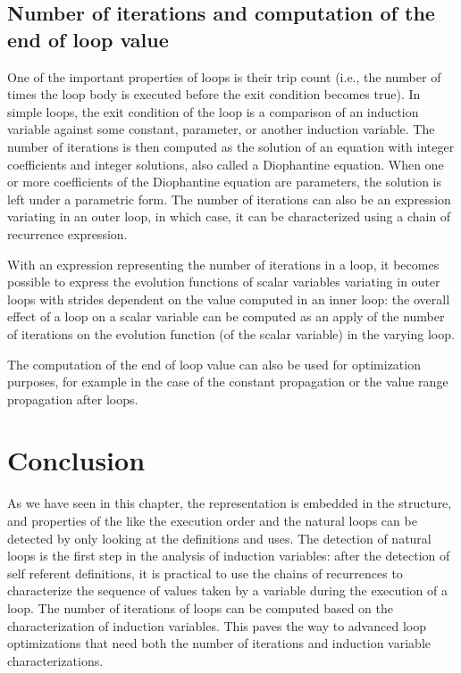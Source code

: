 \subsection{Number of iterations and computation of the end of loop value}

One of the important properties of loops is their trip count (i.e.,
the number of times the loop body is executed before the exit
condition becomes true).  In simple loops, the exit condition of the
loop is a comparison of an induction variable against some constant,
parameter, or another induction variable.  The number of iterations is
then computed as the solution of an equation with integer coefficients
and integer solutions, also called a Diophantine equation.  When one
or more coefficients of the Diophantine equation are parameters, the
solution is left under a parametric form.  The number of iterations
can also be an expression variating in an outer loop, in which case,
it can be characterized using a chain of recurrence expression.

With an expression representing the number of iterations in a loop, it
becomes possible to express the evolution functions of scalar
variables variating in outer loops with strides dependent on the value
computed in an inner loop: the overall effect of a loop on a scalar
variable can be computed as an apply of the number of iterations on
the evolution function (of the scalar variable) in the varying loop.

The computation of the end of loop value can also be used for
optimization purposes, for example in the case of the constant
propagation or the value range propagation after loops.

\section{Conclusion}

As we have seen in this chapter, the \CFG{} representation is embedded
in the \SSA{} structure, and properties of the \CFG{} like the
execution order and the natural loops can be detected by only looking
at the \SSA{} definitions and uses.  The detection of natural loops is
the first step in the analysis of induction variables: after the
detection of self referent definitions, it is practical to use the
chains of recurrences to characterize the sequence of values taken by
a variable during the execution of a loop.  The number of iterations
of loops can be computed based on the characterization of induction
variables.  This paves the way to advanced loop optimizations that
need both the number of iterations and induction variable
characterizations.
